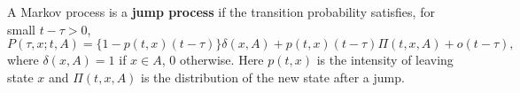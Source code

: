 A Markov process is a \textbf{jump process} if the transition probability satisfies, for small $t - \tau > 0$,
$$P(\tau, x; t, A) = \{1 - p(t, x)(t - \tau)\} \delta(x, A) + p(t, x)(t - \tau) \Pi(t, x, A) + o(t - \tau),$$
where $\delta(x, A) = 1$ if $x \in A$, $0$ otherwise. Here $p(t, x)$ is the intensity of leaving state $x$ and $\Pi(t, x, A)$ is the distribution of the new state after a jump.
